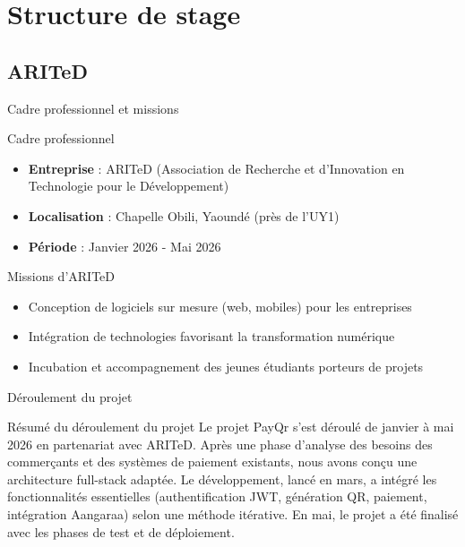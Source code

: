 \documentclass[aspectratio=169,9pt,demo]{beamer}
\begin{document}
\section{\Large Structure de stage}
\subsection{\small ARITeD}

\begin{frame}{Cadre professionnel et missions}
\begin{block}{Cadre professionnel}
    \begin{itemize}
      \item \textbf{Entreprise} : ARITeD (Association de Recherche et d'Innovation en Technologie pour le Développement)
      \item \textbf{Localisation} : Chapelle Obili, Yaoundé (près de l'UY1)
      \item \textbf{Période} : Janvier 2026 - Mai 2026
    \end{itemize}
\end{block}

\begin{block}{Missions d'ARITeD}
    \begin{itemize}
      \item Conception de logiciels sur mesure (web, mobiles) pour les entreprises
      \item Intégration de technologies favorisant la transformation numérique
      \item Incubation et accompagnement des jeunes étudiants porteurs de projets
    \end{itemize}
\end{block}
\end{frame}

\begin{frame}{Déroulement du projet}
  \begin{block}{\Large Résumé du déroulement du projet}
Le projet PayQr s'est déroulé de janvier à mai 2026 en partenariat avec ARITeD. Après une phase d'analyse des besoins des commerçants et des systèmes de paiement existants, nous avons conçu une architecture full-stack adaptée. Le développement, lancé en mars, a intégré les fonctionnalités essentielles (authentification JWT, génération QR, paiement, intégration Aangaraa) selon une méthode itérative. En mai, le projet a été finalisé avec les phases de test et de déploiement.
\end{block}
\end{frame}
\end{document}
